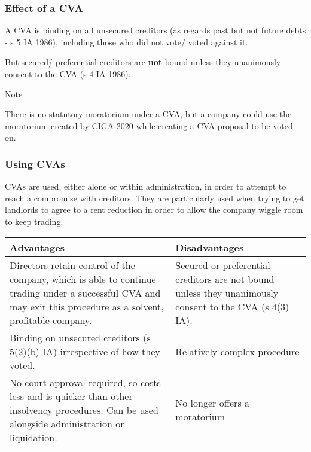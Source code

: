 \documentclass[
]{article}
\newenvironment{env-440d3209-5a60-4bb6-8a13-881ba9304f97}
{
    \savenotes\tcolorbox[blanker,breakable,left=5pt,borderline west={2pt}{-4pt}{blue}]
}
{
    \endtcolorbox\spewnotes
}
\begin{document}
\hypertarget{effect-of-a-cva}{%
\subsubsection{Effect of a CVA}\label{effect-of-a-cva}}

A CVA is binding on all unsecured creditors (as regards past but not
future debts - s 5 IA 1986), including those who did not vote/ voted
against it.

But secured/ preferential creditors are \textbf{not} bound unless they
unanimously consent to the CVA
(\href{https://www.legislation.gov.uk/ukpga/1986/45/section/4}{s 4 IA
1986}).

\begin{env-440d3209-5a60-4bb6-8a13-881ba9304f97}

Note

There is no statutory moratorium under a CVA, but a company could use
the moratorium created by CIGA 2020 while creating a CVA proposal to be
voted on.

\end{env-440d3209-5a60-4bb6-8a13-881ba9304f97}

\hypertarget{using-cvas}{%
\subsubsection{Using CVAs}\label{using-cvas}}

CVAs are used, either alone or within administration, in order to
attempt to reach a compromise with creditors. They are particularly used
when trying to get landlords to agree to a rent reduction in order to
allow the company wiggle room to keep trading.

\begin{longtable}[]{@{}ll@{}}
\toprule()
Advantages & Disadvantages \\
\midrule()
\endhead
Directors retain control of the company, which is able to continue
trading under a successful CVA and may exit this procedure as a solvent,
profitable company. & Secured or preferential creditors are not bound
unless they unanimously consent to the CVA (s 4(3) IA). \\
Binding on unsecured creditors (s 5(2)(b) IA) irrespective of how they
voted. & Relatively complex procedure \\
No court approval required, so costs less and is quicker than other
insolvency procedures. Can be used alongside administration or
liquidation. & No longer offers a moratorium \\
\bottomrule()
\end{longtable}
\end{document}
